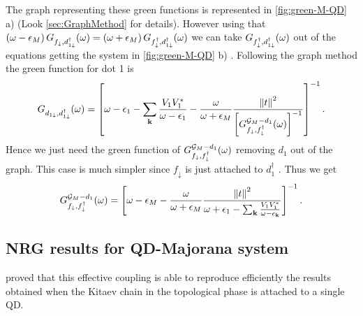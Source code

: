 The graph representing these green functions is represented in \ref{fig:green-M-QD} a)  (Look \ref{sec:GraphMethod} for details). However using that $\left(\omega-\epsilon_{M}\right)G_{f_{\downarrow},d_{1\downarrow}^{\dagger}}(\omega)=\left(\omega+\epsilon_{M}\right)G_{f_{\downarrow}^{\dagger},d_{1\downarrow}^{\dagger}}(\omega)$ we can take
 $G_{f_{\downarrow}^{\dagger},d_{1\downarrow}^{\dagger}}(\omega)$ out of the equations getting the system in \ref{fig:green-M-QD} b) .  Following the graph method the green function for dot 1 is
\begin{equation}
    G_{d_{1\downarrow},d_{1\downarrow}^{\dagger}}(\omega)=\left[\omega-\epsilon_{1}-\sum_{\mathbf{k}}\frac{V_{1}V_{1}^{*}}{\omega-\epsilon_{1}}-\frac{\omega}{\omega+\epsilon_{M}}\frac{\left\Vert t\right\Vert ^{2}}{\left[G_{f_{\downarrow},f_{\downarrow}^{\dagger}}^{ \mathcal{G}_M-d_{1}} (\omega)\right]^{-1}}\right]^{-1}.
\end{equation}
Hence we just need the green function of $G_{f_{\downarrow},f_{\downarrow}^{\dagger}}^{ \mathcal{G}_M-d_{1}} (\omega)$ removing $d_1$ out of the graph. This case is much simpler since $f_\downarrow$ is just attached to $d^\dagger_1$ . Thus we get
\begin{equation}
    G_{f_{\downarrow},f_{\downarrow}^{\dagger}}^{ \mathcal{G}_M-d_{1}} (\omega)=\left[\omega-\epsilon_{M}-\frac{\omega}{\omega+\epsilon_{M}}\frac{\left\Vert t\right\Vert ^{2}}{\omega+\epsilon_{1}-\sum_{\mathbf{k}}\frac{V_{1}V_{1}^{*}}{\omega-\epsilon_{\mathbf{k}}}}\right]^{-1}.
\end{equation}






\subsection{NRG results for QD-Majorana system }



 \citeauthor{ruiz-tijerina_interaction_2015}  proved that this effective coupling  is able to reproduce efficiently the results obtained when the Kitaev chain in the topological phase is attached to a single QD. 


